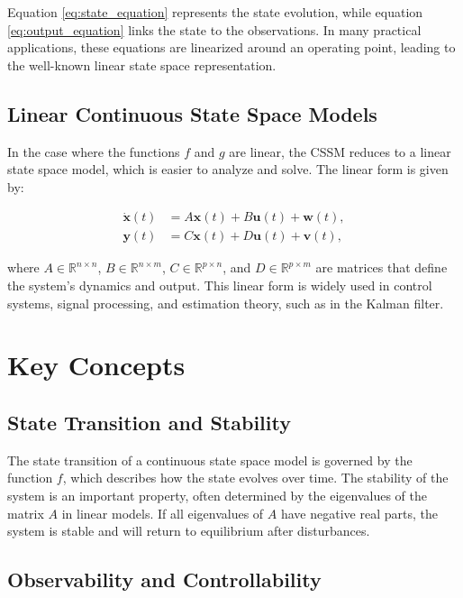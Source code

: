 \documentclass[12pt]{article}
\begin{document}
Equation \eqref{eq:state_equation} represents the state evolution, while equation \eqref{eq:output_equation} links the state to the observations. In many practical applications, these equations are linearized around an operating point, leading to the well-known linear state space representation.

\subsection{Linear Continuous State Space Models}

In the case where the functions \( f \) and \( g \) are linear, the CSSM reduces to a linear state space model, which is easier to analyze and solve. The linear form is given by:

\begin{align}
    \dot{\mathbf{x}}(t) &= A\mathbf{x}(t) + B\mathbf{u}(t) + \mathbf{w}(t), \label{eq:linear_state_equation} \\
    \mathbf{y}(t) &= C\mathbf{x}(t) + D\mathbf{u}(t) + \mathbf{v}(t), \label{eq:linear_output_equation}
\end{align}

where \( A \in \mathbb{R}^{n \times n} \), \( B \in \mathbb{R}^{n \times m} \), \( C \in \mathbb{R}^{p \times n} \), and \( D \in \mathbb{R}^{p \times m} \) are matrices that define the system's dynamics and output. This linear form is widely used in control systems, signal processing, and estimation theory, such as in the Kalman filter.

\section{Key Concepts}

\subsection{State Transition and Stability}

The state transition of a continuous state space model is governed by the function \( f \), which describes how the state evolves over time. The stability of the system is an important property, often determined by the eigenvalues of the matrix \( A \) in linear models. If all eigenvalues of \( A \) have negative real parts, the system is stable and will return to equilibrium after disturbances.

\subsection{Observability and Controllability}
\end{document}

